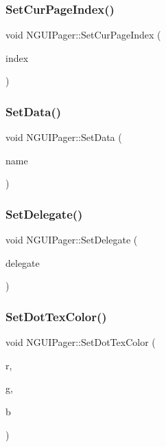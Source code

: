 \subsubsection{\texorpdfstring{Set\+Cur\+Page\+Index()}{SetCurPageIndex()}}
{\footnotesize\ttfamily void N\+G\+U\+I\+Pager\+::\+Set\+Cur\+Page\+Index (\begin{DoxyParamCaption}\item[{int}]{index }\end{DoxyParamCaption})}

\hypertarget{class_n_g_u_i_pager_a2a82a99ec522abb9b9e2efb60672a14e}{}\label{class_n_g_u_i_pager_a2a82a99ec522abb9b9e2efb60672a14e} 
\subsubsection{\texorpdfstring{Set\+Data()}{SetData()}}
{\footnotesize\ttfamily void N\+G\+U\+I\+Pager\+::\+Set\+Data (\begin{DoxyParamCaption}\item[{string \&in}]{name }\end{DoxyParamCaption})}

\hypertarget{class_n_g_u_i_pager_a1ea6baf13b2e56d802cb928f23f2da00}{}\label{class_n_g_u_i_pager_a1ea6baf13b2e56d802cb928f23f2da00} 
\subsubsection{\texorpdfstring{Set\+Delegate()}{SetDelegate()}}
{\footnotesize\ttfamily void N\+G\+U\+I\+Pager\+::\+Set\+Delegate (\begin{DoxyParamCaption}\item[{N\+G\+U\+I\+Pager\+Delegate@}]{delegate }\end{DoxyParamCaption})}

\hypertarget{class_n_g_u_i_pager_a2a538e43e2509b0e2dc18f009eaffa52}{}\label{class_n_g_u_i_pager_a2a538e43e2509b0e2dc18f009eaffa52} 
\subsubsection{\texorpdfstring{Set\+Dot\+Tex\+Color()}{SetDotTexColor()}}
{\footnotesize\ttfamily void N\+G\+U\+I\+Pager\+::\+Set\+Dot\+Tex\+Color (\begin{DoxyParamCaption}\item[{float}]{r,  }\item[{float}]{g,  }\item[{float}]{b }\end{DoxyParamCaption})}

